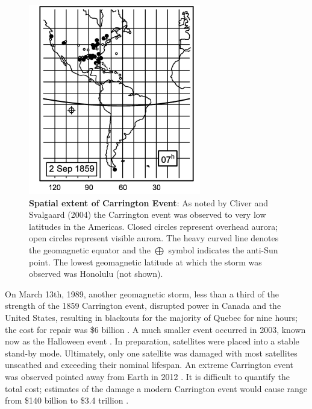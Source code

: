 \documentclass[twoside]{report}
\begin{document}
\begin{figure}[ht]
  \begin{center}
    \includegraphics[scale=1]{carrington-spatial.png}
    \caption{{\bf Spatial extent of Carrington Event}: As noted by Cliver and Svalgaard (2004) the Carrington event was observed to very low latitudes in the Americas. Closed circles represent overhead aurora; open circles represent visible aurora. The heavy curved line denotes the geomagnetic equator and the $\bigoplus$ symbol indicates the anti-Sun point. The lowest geomagnetic latitude at which the storm was observed was Honolulu (not shown).}
    \label{fig:carrington-spatial}
 \end{center}
\end{figure}

On March 13th, 1989, another geomagnetic storm, less than a third of the strength of the 1859 Carrington event, disrupted power in Canada and the United States, resulting in blackouts for the majority of Quebec for nine hours; the cost for repair was \$6 billion \cite{cervantes:2013a}. A much smaller event occurred in 2003, known now as the Halloween event \cite{muller:2014, viljanen:2014}. In preparation, satellites were placed into a stable stand-by mode. Ultimately, only one satellite was damaged with most satellites unscathed and exceeding their nominal lifespan. An extreme Carrington event was observed pointed away from Earth in 2012 \cite{eastwood:2017}. It is difficult to quantify the total cost; estimates of the damage a modern Carrington event would cause range from \$140 billion to \$3.4 trillion \cite{eastwood:2017}.
\end{document}
